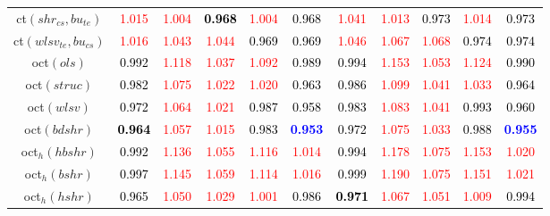 \begin{tabular}[t]{c|>{}cccc>{}c|ccccc}
ct$(shr_{cs}, bu_{te})$ & \textcolor{red}{1.015} & \textcolor{red}{1.004} & \textcolor{black}{\textbf{0.968}} & \textcolor{red}{1.004} & \textcolor{black}{0.968} & \textcolor{red}{1.041} & \textcolor{red}{1.013} & \textcolor{black}{0.973} & \textcolor{red}{1.014} & \textcolor{black}{0.973}\\
ct$(wlsv_{te}, bu_{cs})$ & \textcolor{red}{1.016} & \textcolor{red}{1.043} & \textcolor{red}{1.044} & \textcolor{black}{0.969} & \textcolor{black}{0.969} & \textcolor{red}{1.046} & \textcolor{red}{1.067} & \textcolor{red}{1.068} & \textcolor{black}{0.974} & \textcolor{black}{0.974}\\
oct$(ols)$ & \textcolor{black}{0.992} & \textcolor{red}{1.118} & \textcolor{red}{1.037} & \textcolor{red}{1.092} & \textcolor{black}{0.989} & \textcolor{black}{0.994} & \textcolor{red}{1.153} & \textcolor{red}{1.053} & \textcolor{red}{1.124} & \textcolor{black}{0.990}\\
oct$(struc)$ & \textcolor{black}{0.982} & \textcolor{red}{1.075} & \textcolor{red}{1.022} & \textcolor{red}{1.020} & \textcolor{black}{0.963} & \textcolor{black}{0.986} & \textcolor{red}{1.099} & \textcolor{red}{1.041} & \textcolor{red}{1.033} & \textcolor{black}{0.964}\\
oct$(wlsv)$ & \textcolor{black}{0.972} & \textcolor{red}{1.064} & \textcolor{red}{1.021} & \textcolor{black}{0.987} & \textcolor{black}{0.958} & \textcolor{black}{0.983} & \textcolor{red}{1.083} & \textcolor{red}{1.041} & \textcolor{black}{0.993} & \textcolor{black}{0.960}\\
oct$(bdshr)$ & \textcolor{black}{\textbf{0.964}} & \textcolor{red}{1.057} & \textcolor{red}{1.015} & \textcolor{black}{0.983} & \textcolor{blue}{\textbf{0.953}} & \textcolor{black}{0.972} & \textcolor{red}{1.075} & \textcolor{red}{1.033} & \textcolor{black}{0.988} & \textcolor{blue}{\textbf{0.955}}\\
oct$_h(hbshr)$ & \textcolor{black}{0.992} & \textcolor{red}{1.136} & \textcolor{red}{1.055} & \textcolor{red}{1.116} & \textcolor{red}{1.014} & \textcolor{black}{0.994} & \textcolor{red}{1.178} & \textcolor{red}{1.075} & \textcolor{red}{1.153} & \textcolor{red}{1.020}\\
oct$_h(bshr)$ & \textcolor{black}{0.997} & \textcolor{red}{1.145} & \textcolor{red}{1.059} & \textcolor{red}{1.114} & \textcolor{red}{1.016} & \textcolor{black}{0.999} & \textcolor{red}{1.190} & \textcolor{red}{1.075} & \textcolor{red}{1.151} & \textcolor{red}{1.021}\\
oct$_h(hshr)$ & \textcolor{black}{0.965} & \textcolor{red}{1.050} & \textcolor{red}{1.029} & \textcolor{red}{1.001} & \textcolor{black}{0.986} & \textcolor{black}{\textbf{0.971}} & \textcolor{red}{1.067} & \textcolor{red}{1.051} & \textcolor{red}{1.009} & \textcolor{black}{0.994}\\

\end{tabular}
